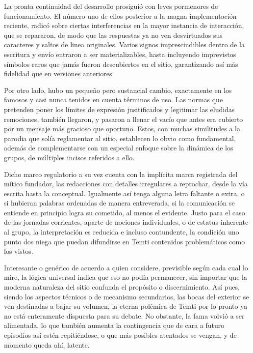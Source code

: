 \documentclass[
]{book}
\begin{document}
La pronta continuidad del desarrollo prosiguió con leves pormenores de funcionamiento. El número uno de ellos posterior a la magna implementación reciente, radicó sobre ciertas interferencias en la mayor instancia de interacción, que se repararon, de modo que las respuestas ya no ven desvirtuados sus caracteres y saltos de linea originales. Varios signos imprescindibles dentro de la escritura y envío entraron a ser materializables, hasta incluyendo imprevistos símbolos raros que jamás fueron descubiertos en el sitio, garantizando así más fidelidad que en versiones anteriores.

Por otro lado, hubo un pequeño pero sustancial cambio, exactamente en los famosos y casi nunca tenidos en cuenta términos de uso. Las normas que pretenden poner los límites de expresión jusitificados y legitimar las eludidas remociones, también llegaron, y pasaron a llenar el vacío que antes era cubierto por un mensaje más gracioso que oportuno. Estos, con muchas similitudes a la parodia que solía reglamentar al sitio, establecen lo obvio como fundamental, además de complementarse con un especial enfoque sobre la dinámica de los grupos, de múltiples incisos referidos a ello.

Dicho marco regulatorio a su vez cuenta con la implícita marca registrada del mítico fundador, las redacciones con detalles irregulares a reprochar, desde la vía escrita hasta la conceptual. Igualmente así tenga alguna letra faltante o extra, o si hubieran palabras ordenadas de manera entreverada, si la comunicación se entiende en principio logra su cometido, al menos el evidente. Justo para el caso de las jornadas corrientes, aparte de nociones individuales, o de estatus inherente al grupo, la interpretación es reducida e incluso contundente, la condición uno punto dos niega que puedan difundirse en Temti contenidos problemáticos como los vistos.

Interesante o genérico de acuerdo a quien considere, previsible según cada cual lo mire, la lógica universal indica que eso no podía permanecer, sin importar que la moderna naturaleza del sitio confunda el propósito o discernimiento. Así pues, siendo los aspectos técnicos o de mecanismo secundarios, las bocas del exterior se ven destinadas a bajar su volumen, la eterna polémica de Temti por lo pronto ya no está enteramente dispuesta para su debate. No obstante, la fama volvió a ser alimentada, lo que también aumenta la contingencia que de cara a futuro episodios así estén repitiéndose, o que más posibles atentados se vengan, y de momento queda ahí, latente.
\end{document}
